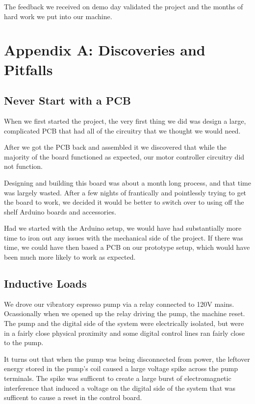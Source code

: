 \documentclass[conference]{IEEEtran}
\begin{document}
The feedback we received on demo day validated the project and the months of
hard work we put into our machine.

\section{Appendix A: Discoveries and Pitfalls}
\subsection{Never Start with a PCB}
When we first started the project, the very first thing we did was design a
large, complicated PCB that had all of the circuitry that we thought
we would need.

After we got the PCB back and assembled it we discovered that while the
majority of the board functioned as expected, our motor controller circuitry did
not function. 

Designing and building this board was about a month long process, and that time
was largely wasted. After a few nights of frantically and pointlessly trying to
get the board to work, we decided it would be better to switch over to using
off the shelf Arduino boards and accessories.

Had we started with the Arduino setup, we would have had substantially more time
to iron out any issues with the mechanical side of the project. If there was
time, we could have then based a PCB on our prototype setup, which would have
been much more likely to work as expected.


\subsection{Inductive Loads}
We drove our vibratory espresso pump via a relay connected to 120V mains.
Ocassionally when we opened up the relay driving the pump, the machine reset.
The pump and the digital side of the system were electrically isolated, but were
in a fairly close physical proximity and some digital control lines ran fairly
close to the pump.

It turns out that when the pump was being disconnected from power, the leftover
energy stored in the pump's coil caused a large voltage spike across the pump
terminals. The spike was sufficent to create a large burst of electromagnetic
interference that induced a voltage on the digital side of the system that was
sufficent to cause a reset in the control board.
\end{document}
